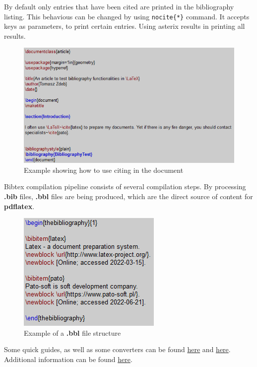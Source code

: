 By default only entries that have been cited are printed in the bibliography listing. This behavious can be changed by using \texttt{\bs nocite\{*\}} command. It accepts keys as parameters, to print certain entries. Using asterix results in printing all results.

\begin{figure}[H]
\centering
\includegraphics[scale=0.9]{content/LaTeX/figures/biblio_latex.png}
\caption{Example showing how to use citing in the document}
\label{fig:biblio_usage}
\end{figure}

Bibtex compilation pipeline consists of several compilation steps. By processing \textbf{.bib} files, \textbf{.bbl} files are being produced, which are the direct source of content for \textbf{pdflatex}.

\begin{figure}[H]
\centering
\includegraphics[scale=0.9]{content/LaTeX/figures/biblio_bbl.png}
\caption{Example of a \textbf{.bbl} file structure}
\label{fig:biblio_bbl_example}
\end{figure}

Some quick guides, as well as some converters can be found \href{https://www.bibtex.com/g/bibtex-format/}{here} and \href{https://www.overleaf.com/learn/latex/Bibliography_management_with_bibtex}{here}. Additional information can be found \href{https://tug.org/bibtex/}{here}.\\

